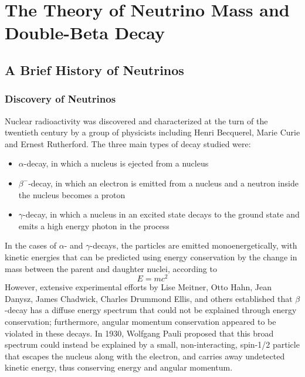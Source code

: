 \documentclass[/main.tex]{subfiles}
\begin{document}
\graphicspath{{./pics/}{ch1/pics/}}

\onlyinsubfile{\textpages}
\chapter{The Theory of Neutrino Mass and Double-Beta Decay}

\section{A Brief History of Neutrinos}
\subsection{Discovery of Neutrinos}
Nuclear radioactivity was discovered and characterized at the turn of the twentieth century by a group of physicists including Henri Becquerel, Marie Curie and Ernest Rutherford.
The three main types of decay studied were:
\begin{itemize}
\item $\alpha$-decay, in which a  nucleus is ejected from a nucleus
\item $\beta^-$-decay, in which an electron is emitted from a nucleus and a neutron inside the nucleus becomes a proton
\item $\gamma$-decay, in which a nucleus in an excited state decays to the ground state and emits a high energy photon in the process
\end{itemize}
In the cases of $\alpha$- and $\gamma$-decays, the particles are emitted monoenergetically, with kinetic energies that can be predicted using energy conservation by the change in mass between the parent and daughter nuclei, according to
\begin{equation}
  E=mc^2
\end{equation}
However, extensive experimental efforts by Lise Meitner, Otto Hahn, Jean Danysz, James Chadwick, Charles Drummond Ellis, and others established that $\beta$-decay has a diffuse energy spectrum that could not be explained through energy conservation; furthermore, angular momentum conservation appeared to be violated in these decays.
In 1930, Wolfgang Pauli proposed that this broad spectrum could instead be explained by a small, non-interacting, spin-1/2 particle that escapes the nucleus along with the electron, and carries away undetected kinetic energy, thus conserving energy and angular momentum.
\end{document}
